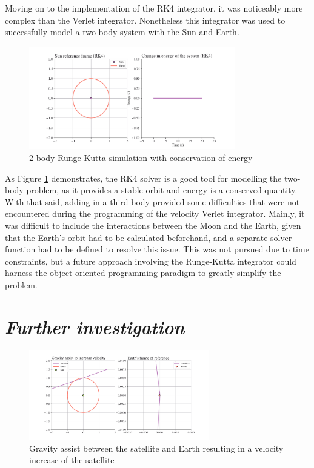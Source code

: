 \documentclass[12pt, english]{report}
\begin{document}
\normalsize{Moving on to the implementation of the RK4 integrator, it was noticeably more complex than the Verlet integrator. Nonetheless this integrator was used to successfully model a two-body system with the Sun and Earth.}
\begin{figure}[ht]
    \centering
    \includegraphics[width=0.8\textwidth]{graphics/rk4.png}
    \caption{2-body Runge-Kutta simulation with conservation of energy}
    \label{fig:rk4}
\end{figure}
\normalsize{
As Figure \ref{fig:rk4} demonstrates, the RK4 solver is a good tool for modelling the two-body problem, as it provides a stable orbit and energy is a conserved quantity. With that said, adding in a third body provided some difficulties that were not encountered during the programming of the velocity Verlet integrator. Mainly, it was difficult to include the interactions between the Moon and the Earth, given that the Earth's orbit had to be calculated beforehand, and a separate solver function had to be defined to resolve this issue. This was not pursued due to time constraints, but a future approach involving the Runge-Kutta integrator could harness the object-oriented programming paradigm to greatly simplify the problem.}

\section{\textsl{Further investigation}}

\begin{figure}[ht]
    \centering
    \includegraphics[width=0.7\textwidth]{graphics/earth_increase1.png}
    \caption{Gravity assist between the satellite and Earth resulting in a velocity increase of the satellite}
    \label{fig:earth_increase1.png}
\end{figure}
\end{document}

